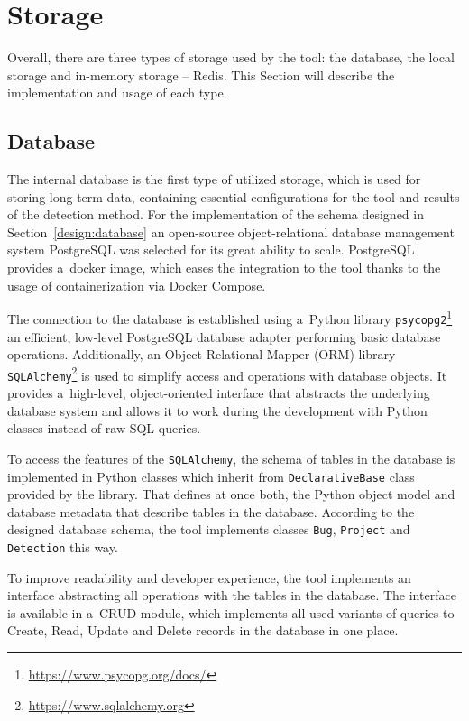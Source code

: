   \section{Storage}
  Overall, there are three types of storage used by the tool: the database, the local storage and in-memory storage -- Redis.
  This Section will describe the implementation and usage of each type.

  \subsection*{Database}
  \label{impl:database}
  The internal database is the first type of utilized storage, which is used for storing long-term data, containing
  essential configurations for the tool and results of the detection method. For the implementation of the schema designed
  in Section~\ref{design:database} an open-source object-relational database management system PostgreSQL was selected
  for its great ability to scale. PostgreSQL provides a~docker image, which eases the integration to the tool
  thanks to the usage of containerization via Docker Compose.

  The connection to the database is established using a~Python library \texttt{psycopg2}\footnote{\href{https://www.psycopg.org/docs/}
  {https://www.psycopg.org/docs/}} an efficient, low-level PostgreSQL database adapter performing
  basic database operations. Additionally, an Object Relational Mapper (ORM) library
  \texttt{SQLAlchemy}\footnote{\href{https://www.sqlalchemy.org}{https://www.sqlalchemy.org}}
  is used to simplify access and operations with database objects.
  It provides a~high-level, object-oriented interface that abstracts the underlying database system and allows it to work
  during the development with Python classes instead of raw SQL queries.

  To access the features of the \texttt{SQLAlchemy}, the schema of tables in the database is implemented in Python classes which
  inherit from \texttt{DeclarativeBase} class provided by the library. That defines at once both, the Python object model
  and database metadata that describe tables in the database. According to the designed database schema, the tool implements
  classes \texttt{Bug}, \texttt{Project} and \texttt{Detection} this way.

  To improve readability and developer experience, the tool implements an interface abstracting all operations with the tables
  in the database. The interface is available in a~CRUD module, which implements all used variants of queries to Create, Read,
  Update and Delete records in the database in one place.

